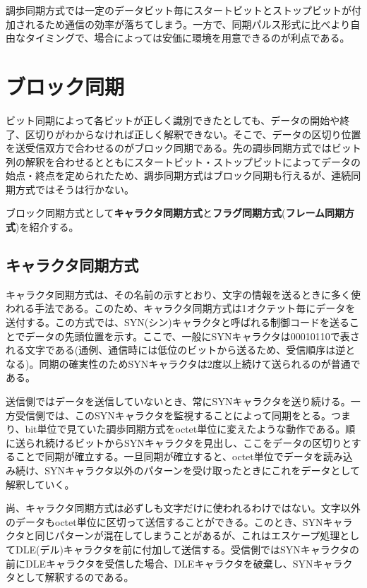 調歩同期方式では一定のデータビット毎にスタートビットとストップビットが付加されるため通信の効率が落ちてしまう。一方で、同期パルス形式に比べより自由なタイミングで、場合によっては安価に環境を用意できるのが利点である。

\section{ブロック同期}
ビット同期によって各ビットが正しく識別できたとしても、データの開始や終了、区切りがわからなければ正しく解釈できない。そこで、データの区切り位置を送受信双方で合わせるのがブロック同期である。先の調歩同期方式ではビット列の解釈を合わせるとともにスタートビット・ストップビットによってデータの始点・終点を定められたため、調歩同期方式はブロック同期も行えるが、連続同期方式ではそうは行かない。

ブロック同期方式として\textbf{キャラクタ同期方式}と\textbf{フラグ同期方式}(\textbf{フレーム同期方式})を紹介する。

\subsection{キャラクタ同期方式}

キャラクタ同期方式は、その名前の示すとおり、文字の情報を送るときに多く使われる手法である。このため、キャラクタ同期方式は1オクテット毎にデータを送付する。この方式では、SYN(シン)キャラクタと呼ばれる制御コードを送ることでデータの先頭位置を示す。ここで、一般にSYNキャラクタは00010110で表される文字である(通例、通信時には低位のビットから送るため、受信順序は逆となる)。同期の確実性のためSYNキャラクタは2度以上続けて送られるのが普通である。

送信側ではデータを送信していないとき、常にSYNキャラクタを送り続ける。一方受信側では、このSYNキャラクタを監視することによって同期をとる。つまり、bit単位で見ていた調歩同期方式をoctet単位に変えたような動作である。順に送られ続けるビットからSYNキャラクタを見出し、ここをデータの区切りとすることで同期が確立する。一旦同期が確立すると、octet単位でデータを読み込み続け、SYNキャラクタ以外のパターンを受け取ったときにこれをデータとして解釈していく。

尚、キャラクタ同期方式は必ずしも文字だけに使われるわけではない。文字以外のデータもoctet単位に区切って送信することができる。このとき、SYNキャラクタと同じパターンが混在してしまうことがあるが、これはエスケープ処理としてDLE(デル)キャラクタを前に付加して送信する。受信側ではSYNキャラクタの前にDLEキャラクタを受信した場合、DLEキャラクタを破棄し、SYNキャラクタとして解釈するのである。

